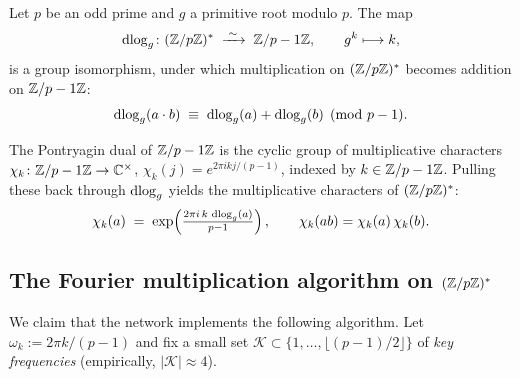\begin{lemma}
\label{lem:dlog-iso}
Let $p$ be an odd prime and $g$ a primitive root modulo $p$.  The map
\begin{equation}
  \operatorname{dlog}_g \colon (\mathbb{Z}/p\mathbb{Z})^* \;\xrightarrow{\;\sim\;}\; \mathbb{Z}/p-1\mathbb{Z},
  \qquad g^{k} \longmapsto k,
  \label{eq:dlog-iso}
\end{equation}
is a group isomorphism, under which multiplication on $(\mathbb{Z}/p\mathbb{Z})^*$ becomes
addition on $\mathbb{Z}/p-1\mathbb{Z}$:
\begin{equation}
  \operatorname{dlog}_g(a \cdot b) \;\equiv\; \operatorname{dlog}_g(a) + \operatorname{dlog}_g(b) \pmod{p-1}.
  \label{eq:mult-to-add}
\end{equation}
\end{lemma}

\noindent The Pontryagin dual of $\mathbb{Z}/p-1\mathbb{Z}$ is the cyclic group of multiplicative
characters $\chi_k \colon \mathbb{Z}/p-1\mathbb{Z} \to \mathbb{C}^\times$, $\chi_k(j) = e^{2\pi i k j /
(p-1)}$, indexed by $k \in \mathbb{Z}/p-1\mathbb{Z}$.  Pulling these back through $\operatorname{dlog}_g$
yields the multiplicative characters of $(\mathbb{Z}/p\mathbb{Z})^*$:
\begin{equation}
  \chi_k(a) \;=\; \exp\!\left(\tfrac{2\pi i\, k\, \operatorname{dlog}_g(a)}{p-1}\right),
  \qquad
  \chi_k(a b) = \chi_k(a)\,\chi_k(b).
  \label{eq:mult-character}
\end{equation}

\subsection{The Fourier multiplication algorithm on \texorpdfstring{$(\mathbb{Z}/p\mathbb{Z})^*$}{(Z/p)*}}
\label{subsec:mul-algorithm}

We claim that the network implements the following algorithm.  Let
$\omega_k := 2\pi k / (p-1)$ and fix a small set $\mathcal{K} \subset \{1,
\ldots, \lfloor (p-1)/2 \rfloor\}$ of \emph{key frequencies}
(empirically, $|\mathcal{K}| \approx 4$).


